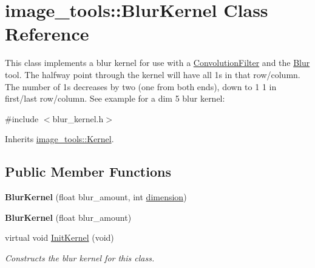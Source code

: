 \hypertarget{classimage__tools_1_1BlurKernel}{}\section{image\+\_\+tools\+:\+:Blur\+Kernel Class Reference}
\label{classimage__tools_1_1BlurKernel}


This class implements a blur kernel for use with a \hyperlink{classimage__tools_1_1ConvolutionFilter}{Convolution\+Filter} and the \hyperlink{classimage__tools_1_1Blur}{Blur} tool. The halfway point through the kernel will have all 1\textquotesingle{}s in that row/column. The number of 1\textquotesingle{}s decreases by two (one from both ends), down to 1 1 in first/last row/column. See example for a dim 5 blur kernel\+:  




{\ttfamily \#include $<$blur\+\_\+kernel.\+h$>$}



Inherits \hyperlink{classimage__tools_1_1Kernel}{image\+\_\+tools\+::\+Kernel}.

\subsection*{Public Member Functions}
\begin{DoxyCompactItemize}
\item 
{\bfseries Blur\+Kernel} (float blur\+\_\+amount, int \hyperlink{classimage__tools_1_1Kernel_a1235fc3f48da943eb72cc9067a5cf385}{dimension})\hypertarget{classimage__tools_1_1BlurKernel_a6918dae797c07ebc3866e34e61c679ae}{}\label{classimage__tools_1_1BlurKernel_a6918dae797c07ebc3866e34e61c679ae}

\item 
{\bfseries Blur\+Kernel} (float blur\+\_\+amount)\hypertarget{classimage__tools_1_1BlurKernel_a1a82b0bf202b50ad17e2e45ea4683985}{}\label{classimage__tools_1_1BlurKernel_a1a82b0bf202b50ad17e2e45ea4683985}

\item 
virtual void \hyperlink{classimage__tools_1_1BlurKernel_ad04663bc57b8f08ae642799feb70221c}{Init\+Kernel} (void)\hypertarget{classimage__tools_1_1BlurKernel_ad04663bc57b8f08ae642799feb70221c}{}\label{classimage__tools_1_1BlurKernel_ad04663bc57b8f08ae642799feb70221c}

\begin{DoxyCompactList}\small\item\em Constructs the blur kernel for this class. \end{DoxyCompactList}\end{DoxyCompactItemize}
